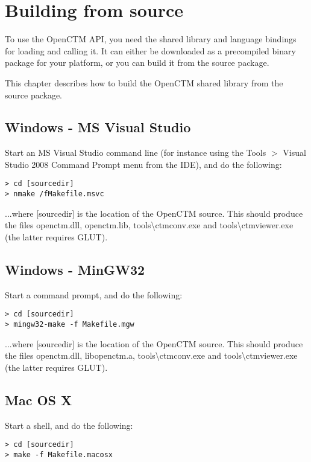 
\chapter{Building from source}
To use the OpenCTM API, you need the shared library and language bindings
for loading and calling it. It can either be downloaded as a precompiled binary
package for your platform, or you can build it from the source package.

This chapter describes how to build the OpenCTM shared library from the source
package.

\section{Windows - MS Visual Studio}
Start an MS Visual Studio command line (for instance using the Tools $>$
Visual Studio 2008 Command Prompt menu from the IDE), and do the following:

\begin{lstlisting}
> cd [sourcedir]
> nmake /fMakefile.msvc
\end{lstlisting}

...where [sourcedir] is the location of the OpenCTM source. This should produce
the files openctm.dll, openctm.lib, tools\textbackslash ctmconv.exe and
tools\textbackslash ctmviewer.exe (the latter requires GLUT).


\section{Windows - MinGW32}
Start a command prompt, and do the following:

\begin{lstlisting}
> cd [sourcedir]
> mingw32-make -f Makefile.mgw
\end{lstlisting}

...where [sourcedir] is the location of the OpenCTM source. This should produce
the files openctm.dll, libopenctm.a, tools\textbackslash ctmconv.exe and
tools\textbackslash ctmviewer.exe (the latter requires GLUT).


\section{Mac OS X}
Start a shell, and do the following:

\begin{lstlisting}
> cd [sourcedir]
> make -f Makefile.macosx
\end{lstlisting}

